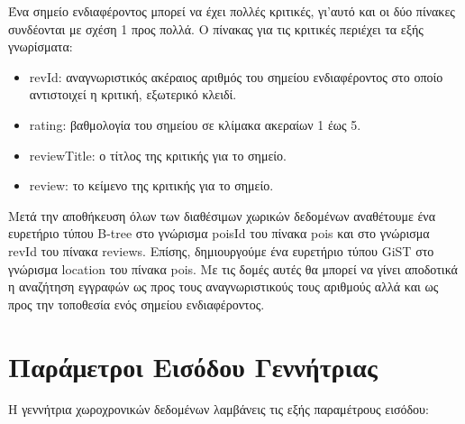 Ένα σημείο ενδιαφέροντος μπορεί να έχει πολλές κριτικές, γι'αυτό και οι δύο πίνακες συνδέονται με σχέση 1 προς πολλά. Ο πίνακας για τις κριτικές περιέχει τα εξής 
γνωρίσματα:

\begin{itemize}
 \item revId: αναγνωριστικός ακέραιος αριθμός του σημείου ενδιαφέροντος στο οποίο αντιστοιχεί η κριτική, εξωτερικό κλειδί.
 \item rating: βαθμολογία του σημείου σε κλίμακα ακεραίων 1 έως 5.
 \item reviewTitle: ο τίτλος της κριτικής για το σημείο.
 \item review: το κείμενο της κριτικής για το σημείο.
\end{itemize}

Μετά την αποθήκευση όλων των διαθέσιμων χωρικών δεδομένων αναθέτουμε ένα ευρετήριο τύπου B-tree στο γνώρισμα poisId του πίνακα pois και στο γνώρισμα revId του πίνακα 
reviews. Επίσης, δημιουργούμε ένα ευρετήριο τύπου GiST στο γνώρισμα location του πίνακα pois. Με τις δομές αυτές θα μπορεί να γίνει αποδοτικά η αναζήτηση 
εγγραφών ως προς τους αναγνωριστικούς τους αριθμούς αλλά και ως προς την τοποθεσία ενός σημείου ενδιαφέροντος. 

\section{Παράμετροι Εισόδου Γεννήτριας}

Η γεννήτρια χωροχρονικών δεδομένων λαμβάνεις τις εξής παραμέτρους εισόδου:

